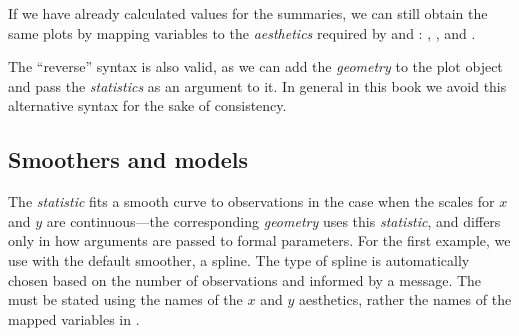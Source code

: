 \documentclass[krantz2]{krantz}\usepackage{knitr}
\begin{document}
If we have already calculated values for the summaries, we can still obtain the same plots by mapping variables to the \emph{aesthetics} required by  and : , ,  and .

\begin{explainbox}
The ``reverse'' syntax is also valid, as we can add the \emph{geometry} to the plot object and pass the \emph{statistics} as an argument to it. In general in this book we avoid this alternative syntax for the sake of consistency.

\begin{knitrout}\footnotesize
{}\color{fgcolor}\begin{kframe}
\begin{alltt}
  \hlopt{+}
  \hlstd{(} \hlstd{=} \hlstd{,}  
\end{alltt}
\end{kframe}
\end{knitrout}
\end{explainbox}

\subsection{Smoothers and models}
The \emph{statistic}  fits a smooth curve to observations in the case when the scales for $x$ and $y$ are continuous---the corresponding \emph{geometry}  uses this \emph{statistic}, and differs only in how arguments are passed to formal parameters. For the first example, we use  with the default smoother, a spline. The type of spline is automatically chosen based on the number of observations and informed by a message. The  must be stated using the names of the $x$ and $y$ aesthetics, rather the names of the mapped variables in .

\begin{knitrout}\footnotesize
{}\color{fgcolor}\begin{kframe}
\begin{alltt}
\hlstd{(}  \hlstd{(}    \hlopt{+}
       \hlstd{(}  \hlopt{~} 
\end{alltt}
\end{kframe}
\end{knitrout}
\end{document}

